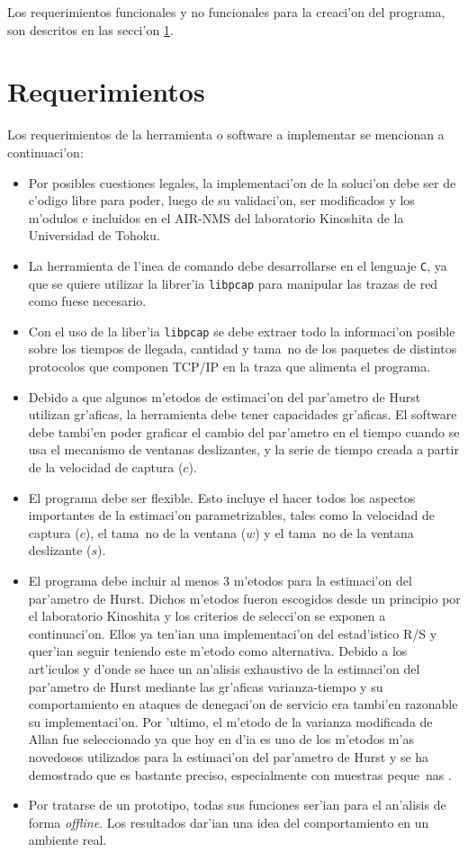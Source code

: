 Los requerimientos funcionales y no funcionales para la creaci'on del programa,
son descritos en las secci'on \ref{sect:requirements}. 

\section{Requerimientos} \label{sect:requirements}

Los requerimientos de la herramienta o software a implementar se mencionan a
continuaci'on: 

\begin{itemize}
\item Por posibles cuestiones legales, la implementaci'on de la soluci'on 
debe ser de c'odigo libre para poder, luego de su validaci'on, ser
modificados y los m'odulos e incluidos en el AIR-NMS del laboratorio Kinoshita
de la Universidad de Tohoku.
\item La herramienta de l'inea de comando debe desarrollarse en el lenguaje
{\tt C}, ya que se quiere utilizar la librer'ia {\tt libpcap} para manipular
las trazas de red como fuese necesario.
\item Con el uso de la liber'ia {\tt libpcap} se debe extraer todo la
informaci'on posible sobre los tiempos de llegada, cantidad y tama~no de los
paquetes de distintos protocolos que componen TCP/IP en la traza que alimenta
el programa.
\item Debido a que algunos m'etodos de estimaci'on del par'ametro de Hurst
utilizan gr'aficas, la herramienta debe tener capacidades gr'aficas. 
El software debe tambi'en poder graficar el cambio del par'ametro en el tiempo
cuando se usa el mecanismo de ventanas deslizantes, y la serie de tiempo
creada a partir de la velocidad de captura ($c$).
\item El programa debe ser flexible. Esto incluye el hacer todos los aspectos
importantes de la estimaci'on parametrizables, tales como la velocidad de 
captura ($c$), el tama~no de la ventana ($w$) y el tama~no de la ventana
deslizante ($s$).
\item El programa debe incluir al menos 3 m'etodos para la estimaci'on del 
par'ametro de Hurst. Dichos m'etodos fueron escogidos desde un principio por
el laboratorio Kinoshita y los criterios de selecci'on se exponen a
continuaci'on. Ellos ya ten'ian una implementaci'on del estad'istico R/S y
quer'ian seguir teniendo este m'etodo como alternativa. Debido a los art'iculos 
\cite{intelligentfuzzy} y \cite{xiang:292} d'onde se hace un an'alisis
exhaustivo de la estimaci'on del par'ametro de Hurst mediante las gr'aficas
varianza-tiempo y su comportamiento en ataques de denegaci'on de servicio era
tambi'en razonable su implementaci'on. Por 'ultimo, el m'etodo de la varianza
modificada de Allan fue seleccionado ya que hoy en d'ia es uno de los m'etodos 
m'as novedosos utilizados para la estimaci'on del par'ametro de Hurst y se ha
demostrado que es bastante preciso, especialmente con muestras peque~nas
\cite{MAVARStefano}. 
\item  Por tratarse de un prototipo, todas sus funciones ser'ian para el 
an'alisis de forma {\it offline}. Los resultados dar'ian una idea del
comportamiento en un ambiente real.
\end{itemize}


